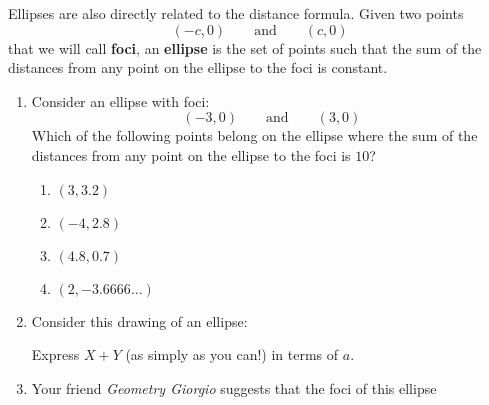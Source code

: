 \documentclass[nooutcomes,noauthor,handout]{ximera}
\begin{document}
\begin{question}
  Ellipses are also directly related to the distance formula.  Given
  two points
  \[
  (-c,0) \qquad\text{and} \qquad (c,0)
  \]
  that we will call \textbf{foci}, an \textbf{ellipse} is the set
  of points such that the sum of the distances from any point on
  the ellipse to the foci is constant.
  \begin{enumerate}      
  \item Consider an ellipse with foci:
    \[
    (-3,0) \qquad \text{and}\qquad (3,0)
    \]%
    Which of the following points belong on the ellipse where the sum
    of the distances from any point on the ellipse to the foci is
    $10$?
    \begin{enumerate}
    \item $(3,3.2)$ %
    \item $(-4,2.8)$ %
    \item $(4.8,0.7)$ %
    \item $(2,-3.6666\dots)$ %
    \end{enumerate}
    \item Consider this drawing of an ellipse:
      \begin{center}
      \end{center}
      Express $X+Y$ (as simply as you can!) in terms of $a$.
    \item Your friend \textit{Geometry Giorgio} suggests that the foci of this ellipse
      \begin{center}
\end{center}
\end{enumerate}
\end{question}
\end{document}
